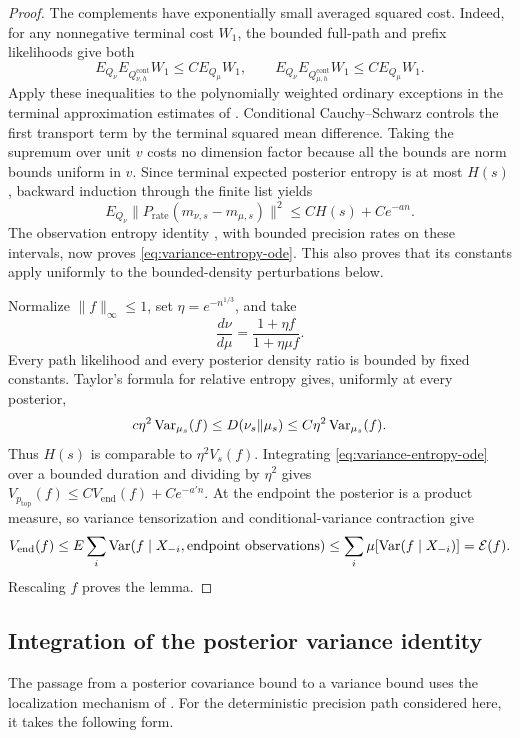 \begin{proof}
The complements have exponentially small averaged squared cost. Indeed,
for any nonnegative terminal cost $W_1$, the bounded full-path and
prefix likelihoods give both
\[
 E_{Q_\nu}E_{Q_{\nu,h}^{\mathrm{cont}}}W_1
 \le C E_{Q_\mu}W_1,
 \qquad
 E_{Q_\nu}E_{Q_{\mu,h}^{\mathrm{cont}}}W_1
 \le C E_{Q_\mu}W_1.
\]
Apply these inequalities to the polynomially weighted ordinary
exceptions in the terminal approximation estimates of
\cite[Section~19.4]{CM}. Conditional Cauchy--Schwarz controls the first
transport term by the terminal squared mean difference. Taking the
supremum over unit $v$ costs no dimension factor because all the bounds
are norm bounds uniform in $v$. Since terminal expected posterior entropy
is at most $H(s)$, backward induction through the finite list yields
\[
 E_{Q_\nu}\|P_{\mathrm{rate}}
                   (m_{\nu,s}-m_{\mu,s})\|^2
 \le CH(s)+Ce^{-a n}.
\]
The observation entropy identity
\cite[Lemma~19.2]{CM}, with bounded precision rates on these intervals,
now proves \eqref{eq:variance-entropy-ode}. This also proves that its
constants apply uniformly to the bounded-density perturbations below.

Normalize $\|f\|_\infty\le1$, set $\eta=e^{-n^{1/3}}$, and take
\[
 \frac{d\nu}{d\mu}=\frac{1+\eta f}{1+\eta\mu f}.
\]
Every path likelihood and every posterior density ratio is bounded by
fixed constants. Taylor's formula for relative entropy gives, uniformly
at every posterior,
\[
 c\eta^2\operatorname{Var}_{\mu_s}(f)
 \le D(\nu_s\Vert\mu_s)
 \le C\eta^2\operatorname{Var}_{\mu_s}(f).
\]
Thus $H(s)$ is comparable to $\eta^2V_s(f)$. Integrating
\eqref{eq:variance-entropy-ode} over a bounded duration and dividing by
$\eta^2$ gives
$V_{p_{\mathrm{top}}}(f)\le CV_{\mathrm{end}}(f)+Ce^{-a'n}$.
At the endpoint the posterior is a product measure, so variance
tensorization and conditional-variance contraction give
\[
 V_{\mathrm{end}}(f)
 \le E\sum_i\operatorname{Var}(f\mid X_{-i},\text{endpoint observations})
 \le\sum_i\mu[\operatorname{Var}(f\mid X_{-i})]=\mathcal E(f).
\]
Rescaling $f$ proves the lemma.
\end{proof}

\subsection{Integration of the posterior variance identity}

The passage from a posterior covariance bound to a variance bound uses
the localization mechanism of
\cite[Lemma~9, arXiv version~2]{EldanKoehlerZeitouni2022}.
For the deterministic precision path considered here, it takes the following
form.

